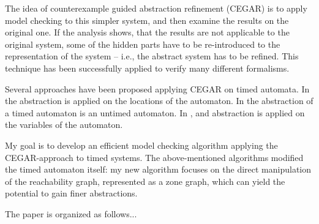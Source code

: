 The idea of counterexample guided abstraction refinement (CEGAR) \cite{clarke2003counterexample} is to apply 
model checking to this simpler system, and then examine the results on the original one.
If the analysis shows, that the results are not applicable to the original system, some of the hidden parts have to be re-introduced to the representation of the system -- i.e.,
the abstract system has to be refined. This technique has been successfully applied to verify many different
formalisms.

Several approaches have been proposed applying CEGAR on timed automata.  In \cite{kemper2007sat}
the abstraction is applied on the locations of the automaton. In
\cite{nagaoka2010abstraction} the abstraction of a timed automaton is an untimed
automaton. In \cite{dierks2007automatic, he2010compositional}, and
\cite{okano2011clock} abstraction is applied on the variables of the automaton.

My goal is to develop an efficient model checking algorithm applying the
CEGAR-approach to timed systems. The above-mentioned algorithms modified the timed automaton itself: my new 
algorithm focuses on the direct manipulation of the reachability graph, represented as a zone graph, which can
yield the potential to gain finer abstractions.

The paper is organized as follows... 



